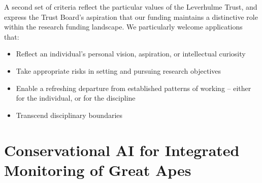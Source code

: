 A second set of criteria reflect the particular values of the Leverhulme Trust, and express the Trust Board’s aspiration that our funding maintains a distinctive role within the research funding landscape. We particularly welcome applications that:

\begin{itemize}
    \item Reflect an individual’s personal vision, aspiration, or intellectual curiosity
    \item Take appropriate risks in setting and pursuing research objectives 
    \item Enable a refreshing departure from established patterns of working – either for the individual, or for the discipline
    \item Transcend disciplinary boundaries
\end{itemize}




\newpage

\section*{Conservational AI for Integrated Monitoring of Great Apes}

